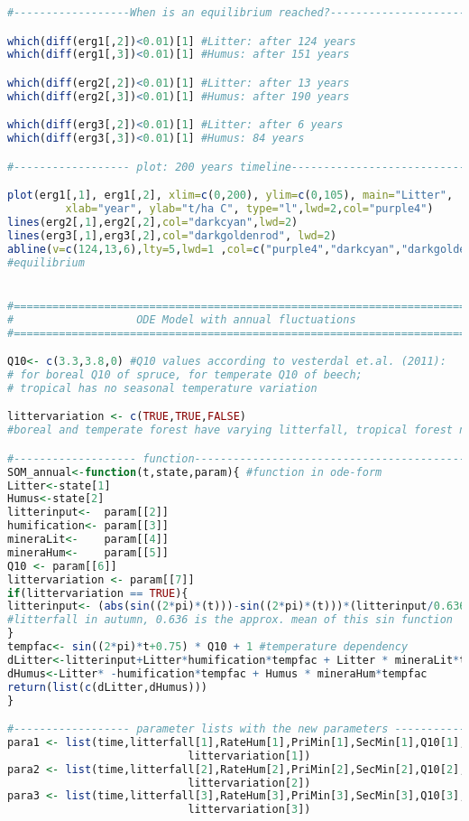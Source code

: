 \documentclass[10pt, a4paper]{article}
\begin{document}
\begin{lstlisting}[language=R]
#------------------When is an equilibrium reached?----------------------

which(diff(erg1[,2])<0.01)[1] #Litter: after 124 years
which(diff(erg1[,3])<0.01)[1] #Humus: after 151 years

which(diff(erg2[,2])<0.01)[1] #Litter: after 13 years
which(diff(erg2[,3])<0.01)[1] #Humus: after 190 years

which(diff(erg3[,2])<0.01)[1] #Litter: after 6 years
which(diff(erg3[,3])<0.01)[1] #Humus: 84 years

#------------------ plot: 200 years timeline-----------------------------

plot(erg1[,1], erg1[,2], xlim=c(0,200), ylim=c(0,105), main="Litter", 
		 xlab="year", ylab="t/ha C", type="l",lwd=2,col="purple4")
lines(erg2[,1],erg2[,2],col="darkcyan",lwd=2)
lines(erg3[,1],erg3[,2],col="darkgoldenrod", lwd=2)
abline(v=c(124,13,6),lty=5,lwd=1 ,col=c("purple4","darkcyan","darkgoldenrod")) 
#equilibrium


#=============================================================================
#                   ODE Model with annual fluctuations
#=============================================================================

Q10<- c(3.3,3.8,0) #Q10 values according to vesterdal et.al. (2011): 
# for boreal Q10 of spruce, for temperate Q10 of beech; 
# tropical has no seasonal temperature variation

littervariation <- c(TRUE,TRUE,FALSE) 
#boreal and temperate forest have varying litterfall, tropical forest not

#------------------- function---------------------------------------------
SOM_annual<-function(t,state,param){ #function in ode-form
Litter<-state[1]
Humus<-state[2]
litterinput<-  param[[2]]
humification<- param[[3]]
mineraLit<-    param[[4]]
mineraHum<-    param[[5]]
Q10 <- param[[6]]
littervariation <- param[[7]]
if(littervariation == TRUE){
litterinput<- (abs(sin((2*pi)*(t)))-sin((2*pi)*(t)))*(litterinput/0.636) 
#litterfall in autumn, 0.636 is the approx. mean of this sin function
}
tempfac<- sin((2*pi)*t+0.75) * Q10 + 1 #temperature dependency
dLitter<-litterinput+Litter*humification*tempfac + Litter * mineraLit*tempfac
dHumus<-Litter* -humification*tempfac + Humus * mineraHum*tempfac
return(list(c(dLitter,dHumus)))
}

#------------------ parameter lists with the new parameters -----------------
para1 <- list(time,litterfall[1],RateHum[1],PriMin[1],SecMin[1],Q10[1],
							littervariation[1])
para2 <- list(time,litterfall[2],RateHum[2],PriMin[2],SecMin[2],Q10[2],
							littervariation[2])
para3 <- list(time,litterfall[3],RateHum[3],PriMin[3],SecMin[3],Q10[3],
							littervariation[3])


\end{lstlisting}
\end{document}
